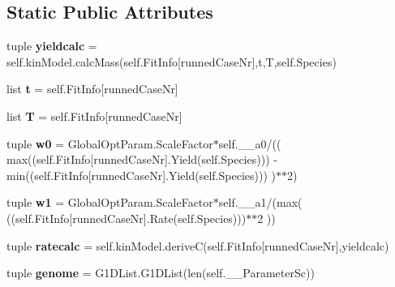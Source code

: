 \subsection*{\-Static \-Public \-Attributes}
\begin{DoxyCompactItemize}
\item 
\hypertarget{classEvolve_1_1GenericOpt_a2fbe893c14cb10f103f9ea9b2557cba6}{tuple {\bfseries yieldcalc} = self.\-kin\-Model.\-calc\-Mass(self.\-Fit\-Info\mbox{[}runned\-Case\-Nr\mbox{]},t,\-T,self.\-Species)}\label{classEvolve_1_1GenericOpt_a2fbe893c14cb10f103f9ea9b2557cba6}

\item 
\hypertarget{classEvolve_1_1GenericOpt_abec1bbb9349eb96482477f34004b17c9}{list {\bfseries t} = self.\-Fit\-Info\mbox{[}runned\-Case\-Nr\mbox{]}}\label{classEvolve_1_1GenericOpt_abec1bbb9349eb96482477f34004b17c9}

\item 
\hypertarget{classEvolve_1_1GenericOpt_a1e59b731e488629a4f16f663ae940aaa}{list {\bfseries \-T} = self.\-Fit\-Info\mbox{[}runned\-Case\-Nr\mbox{]}}\label{classEvolve_1_1GenericOpt_a1e59b731e488629a4f16f663ae940aaa}

\item 
\hypertarget{classEvolve_1_1GenericOpt_a91b686579e9a78eb3e7821f6a340e784}{tuple {\bfseries w0} = \-Global\-Opt\-Param.\-Scale\-Factor$\ast$self.\-\_\-\-\_\-a0/(( max((self.\-Fit\-Info\mbox{[}runned\-Case\-Nr\mbox{]}.\-Yield(self.\-Species))) -\/min((self.\-Fit\-Info\mbox{[}runned\-Case\-Nr\mbox{]}.\-Yield(self.\-Species))) )$\ast$$\ast$2)}\label{classEvolve_1_1GenericOpt_a91b686579e9a78eb3e7821f6a340e784}

\item 
\hypertarget{classEvolve_1_1GenericOpt_a2fc2c230f7bac60f25c814e3eb5dc309}{tuple {\bfseries w1} = \-Global\-Opt\-Param.\-Scale\-Factor$\ast$self.\-\_\-\-\_\-a1/(max( ((self.\-Fit\-Info\mbox{[}runned\-Case\-Nr\mbox{]}.\-Rate(self.\-Species)))$\ast$$\ast$2 ))}\label{classEvolve_1_1GenericOpt_a2fc2c230f7bac60f25c814e3eb5dc309}

\item 
\hypertarget{classEvolve_1_1GenericOpt_a0399af486013de9e1015e0e7e93b2294}{tuple {\bfseries ratecalc} = self.\-kin\-Model.\-derive\-C(self.\-Fit\-Info\mbox{[}runned\-Case\-Nr\mbox{]},yieldcalc)}\label{classEvolve_1_1GenericOpt_a0399af486013de9e1015e0e7e93b2294}

\item 
\hypertarget{classEvolve_1_1GenericOpt_a5bb69d15487cba5851a8ec56399ffb26}{tuple {\bfseries genome} = \-G1\-D\-List.\-G1\-D\-List(len(self.\-\_\-\-\_\-\-Parameter\-Sc))}\label{classEvolve_1_1GenericOpt_a5bb69d15487cba5851a8ec56399ffb26}


\end{DoxyCompactItemize}

